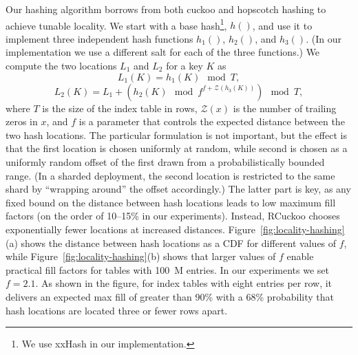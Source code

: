 Our hashing algorithm borrows from both cuckoo and hopscotch hashing
to achieve tunable locality.   We start with a base
hash\footnote{We use xxHash in our implementation.}, $h()$, and use it to
implement three independent hash functions $h_1()$, $h_2()$, and $h_3()$.
(In our implementation we use a different salt for each of the
three functions.)  We compute the two locations $L_1$ and $L_2$
for a key $K$ as
\[ L_1(K) = h_1(K)\mod T, \]
\[ L_2(K) = L_1 + (h_2(K)\mod f^{f+\mathcal{Z}(h_3(K))})\mod T, \]
\noindent where $T$ is the size of the index table in rows,
$\mathcal{Z}(x)$ is the number of trailing zeros in $x$, and $f$ is a
parameter that controls the expected distance between the two hash
locations.  The particular formulation is not important, but the
effect is that the first location is chosen uniformly at random, while
second is chosen as a uniformly random offset of the first drawn from
a probabilistically bounded range.  (In a sharded deployment, the
second location is restricted to the same shard by ``wrapping around''
the offset accordingly.) The latter part is key, as any fixed bound on
the distance between hash locations leads to low maximum fill factors
(on the order of 10--15\% in our experiments).  Instead, RCuckoo
chooses exponentially fewer locations at increased distances.
Figure~\ref{fig:locality-hashing}(a) shows the distance between hash
locations as a CDF for different values of $f$,
while Figure~\ref{fig:locality-hashing}(b) shows that larger values of
$f$ enable practical fill factors for tables with 100~M entries. In
our experiments we set $f=2.1$.  As shown in the figure, for index
tables with eight entries per row, it delivers an expected max fill of
greater than 90\% with a 68\% probability that hash locations are
located three or fewer rows apart.

